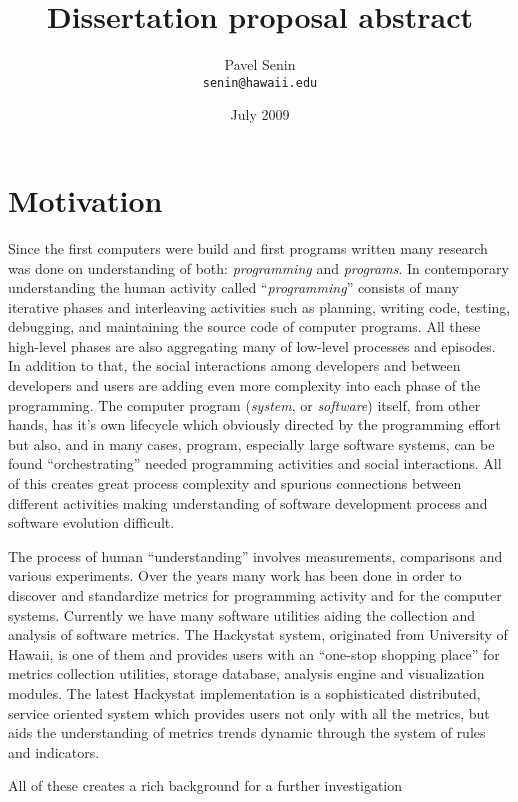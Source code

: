 \documentclass[11pt,oneside]{article}
\begin{document}
\title{Dissertation proposal abstract}
\author{Pavel Senin \\
 \texttt{senin@hawaii.edu}
}
\date{July 2009}
\maketitle

\section{Motivation}
Since the first computers were build and first programs written many research was done on understanding of both: \textit{programming} and \textit{programs}. In contemporary understanding the human activity called ``\textit{programming}'' consists of many iterative phases and interleaving activities such as planning, writing code, testing, debugging, and maintaining the source code of computer programs. All these high-level phases are also aggregating many of low-level processes and episodes. In addition to that, the social interactions among developers and between developers and users are adding even more complexity into each phase of the programming. The computer program (\textit{system}, or \textit{software}) itself, from other hands, has it's own lifecycle which obviously directed by the programming effort but also, and in many cases, program, especially large software systems, can be found ``orchestrating'' needed programming activities and social interactions. All of this creates great process complexity and spurious connections between different activities making understanding of software development process and software evolution difficult.

The process of human ``understanding'' involves measurements, comparisons and various experiments. Over the years many work has been done in order to discover and standardize metrics for programming activity and for the computer systems. Currently we have many software utilities aiding the collection and analysis of software metrics. The Hackystat system, originated from University of Hawaii, is one of them and provides users with an ``one-stop shopping place'' for metrics collection utilities, storage database, analysis engine and visualization modules. The latest Hackystat implementation is a sophisticated distributed, service oriented system which provides users not only with all the metrics, but aids the understanding of metrics trends dynamic through the system of rules and indicators.

All of these creates a rich background for a further investigation 
\end{document}
